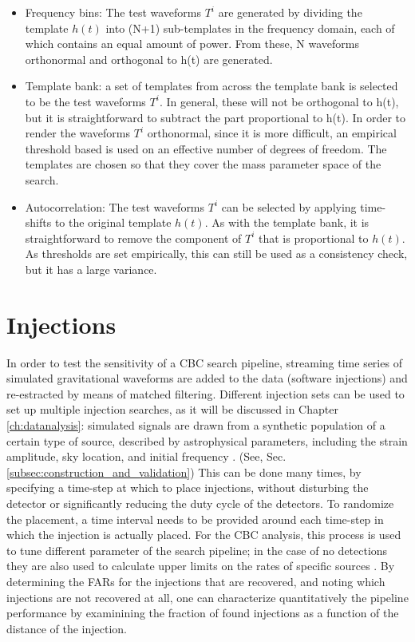 \documentclass[binding=0.6cm, LaM]{sapthesis}
\begin{document}
		\begin{itemize}
 			 \item Frequency bins: The test waveforms $T^i$ are generated by dividing the template $h(t)$ into (N+1) 
				  sub-templates in the frequency domain, each of which contains an equal amount of power. 
				  From these, N waveforms orthonormal and orthogonal to h(t) are generated. 
 			 \item Template bank: a set of templates from across the template bank is selected to be the test waveforms $T^i$.
				  In general, these will not be orthogonal to h(t), but it is straightforward to subtract the part proportional to h(t). 	
				  In order to render the waveforms $T^i$ orthonormal, since it is more difficult, 
				  an empirical threshold based is used on an effective number of degrees of freedom. 
				  The templates are chosen so that they cover the mass parameter space of the search. 
 			 \item Autocorrelation: The test waveforms $T^i$ can be selected by applying time-shifts to the original template  $h(t)$. 
				  As with the template bank, it is straightforward to remove the component of $T^i$ that is proportional to $h(t)$. 
				  As thresholds are set empirically, this can still be used as a consistency check, but it has a large variance. 
		\end{itemize}
\section{Injections}

        In order to test the sensitivity of a CBC search pipeline,
        streaming time series of simulated gravitational waveforms are added to the data (software injections)
        and re-estracted by means of matched filtering.
        Different injection sets can be used to set up multiple injection searches, as it will be discussed in Chapter \ref{ch:datanalysis}:
        simulated signals are drawn from a synthetic population of a certain type of source,
        described by astrophysical parameters, including the strain amplitude, sky location,
        and initial frequency \cite{30}. (See, Sec.\ref{subsec:construction_and_validation})
        This can be done many times, by specifying a time-step at which to place injections,
        without disturbing the detector or significantly reducing the duty cycle of the detectors.
        To randomize the placement, a time interval needs to be provided around
        each time-step in which the injection is actually placed.
        For the CBC analysis, this process is used to tune different parameter of the search pipeline;
        in the case of no detections they are also used to calculate upper limits on the rates of specific sources \cite{47}.
        By determining the FARs for the injections that are recovered,
        and noting which injections are not recovered at all,
        one can characterize quantitatively the pipeline performance \cite{47, 48}
        by examinining the fraction of found injections as a function of the distance of the injection.
\end{document}
